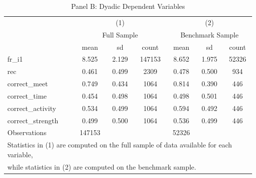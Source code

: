 \begin{table}[htbp]\centering
\def\sym#1{\ifmmode^{#1}\else\(^{#1}\)\fi}
\caption{Panel B: Dyadic Dependent Variables}
\begin{tabular}{l*{2}{ccc}}
\toprule
                    &\multicolumn{3}{c}{(1)}               &\multicolumn{3}{c}{(2)}               \\
                    &\multicolumn{3}{c}{Full Sample}       &\multicolumn{3}{c}{Benchmark Sample}  \\
                    &        mean&          sd&       count&        mean&          sd&       count\\
\midrule
fr\_i1               &       8.525&       2.129&      147153&       8.652&       1.975&       52326\\
rec                 &       0.461&       0.499&        2309&       0.478&       0.500&         934\\
correct\_meet        &       0.749&       0.434&        1064&       0.814&       0.390&         446\\
correct\_time        &       0.454&       0.498&        1064&       0.498&       0.501&         446\\
correct\_activity    &       0.534&       0.499&        1064&       0.594&       0.492&         446\\
correct\_strength    &       0.499&       0.500&        1064&       0.536&       0.499&         446\\
\midrule
Observations        &      147153&            &            &       52326&            &            \\
\bottomrule
\multicolumn{7}{l}{\footnotesize Statistics in (1) are computed on the full sample of data available for each variable,}\\
\multicolumn{7}{l}{\footnotesize while statistics in (2) are computed on the benchmark sample.}\\
\end{tabular}
\end{table}
